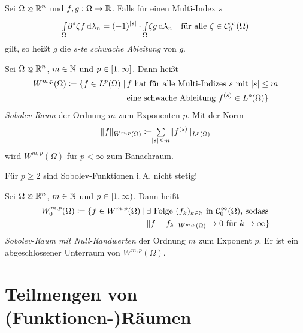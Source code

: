 \documentclass{cheat-sheet}
\begin{document}

\begin{defn}
  Sei $\Omega \opn \R^n$ und $f, g : \Omega \to \mathbb{R}$. Falls für einen Multi-Index $s$
  \[
    {\textstyle \int\limits_{\Omega}^{}} \partial^s \zeta f \,\mathrm{d} \lambda_n = (-1)^{\lvert s\rvert} \cdot {\textstyle \int\limits_{\Omega}^{}} \zeta g \,\mathrm{d} \lambda_n 
    \quad
    \text{für alle } \zeta \in \mathcal{C}_0^\infty(\Omega)
  \]
  gilt, so heißt $g$ die \emph{$s$-te schwache Ableitung} von $g$.
\end{defn}


\begin{defn}
  Sei $\Omega \opn \R^n$, $m \in \mathbb{N}$ und $p \in \left[ 1, \infty \right]$. Dann heißt
  \begin{align*}
    W^{m,p}(\Omega) \coloneqq \{ f \in L^p(\Omega) \mid \, &\text{$f$ hat für alle Multi-Indizes $s$ mit $\lvert s\rvert \leq m$}\\
    &\text{eine schwache Ableitung $f^{(s)} \in L^p(\Omega)$} \}
  \end{align*}
  \emph{Sobolev-Raum} der Ordnung $m$ zum Exponenten $p$. Mit der Norm
  \[ \norm{f}_{W^{m,p}(\Omega)} \coloneqq \!\! \sum_{\abs{s} \leq m} \norm{f^{(s)}}_{L^p(\Omega)} \]
  wird $W^{m,p}(\Omega)$ für $p < \infty$ zum Banachraum.
\end{defn}

\begin{samepage}


\begin{bem}
  Für $p \geq 2$ sind Sobolev-Funktionen i.\,A. nicht stetig!
\end{bem}

\begin{defn}
  Sei $\Omega \opn \R^n$, $m \in \mathbb{N}$ und $p \in \left[ 1, \infty \right)$. Dann heißt
  \begin{align*}
    W^{m,p}_0(\Omega) \coloneqq \{ f \in W^{m,p}(\Omega) \mid \, &\text{$\exists$ Folge $(f_k)_{k \in \mathbb{N}}$ in $\mathcal{C}_0^\infty(\Omega)$, sodass}\\
    &\lVert f - f_k\rVert_{W^{m,p}(\Omega)} \to 0 \text{ für } k \to \infty \}
  \end{align*}
  \emph{Sobolev-Raum mit Null-Randwerten} der Ordnung $m$ zum Exponent $p$. Er ist ein abgeschlossener Unterraum von $W^{m,p}(\Omega)$.
\end{defn}

\section{Teilmengen von (Funktionen-)Räumen}

\end{samepage}
\end{document}
